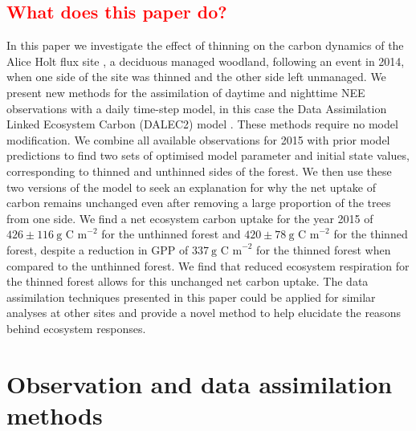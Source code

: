 \documentclass[draft,linenumbers]{agujournal}
\begin{document}
\subsection{\textcolor{red}{What does this paper do?}}
In this paper we investigate the effect of thinning on the carbon dynamics of the Alice Holt flux site \citep{wilkinson2012inter}, a deciduous managed woodland, following an event in 2014, when one side of the site was thinned and the other side left unmanaged. 
We present new methods for the assimilation of daytime and nighttime NEE observations with a daily time-step model, in this case the Data Assimilation Linked Ecosystem Carbon (DALEC2) model \citep{Bloom2015}. These methods require no model modification. We combine all available observations for 2015 with prior model predictions to find two sets of optimised model parameter and initial state values, corresponding to thinned and unthinned sides of the forest. We then use these two versions of the model to seek an explanation for why the net uptake of carbon remains unchanged even after removing a large proportion of the trees from one side. We find a net ecosystem carbon uptake for the year 2015 of \(426 \pm 116~\text{g C m}^{-2}\) for the unthinned forest and \(420 \pm 78~\text{g C m}^{-2}\) for the thinned forest, despite a reduction in GPP of \(337~\text{g C m}^{-2}\) for the thinned forest when compared to the unthinned forest. We find that reduced ecosystem respiration for the thinned forest allows for this unchanged net carbon uptake. The data assimilation techniques presented in this paper could be applied for similar analyses at other sites and provide a novel method to help elucidate the reasons behind ecosystem responses.      

\section{Observation and data assimilation methods}
\end{document}
